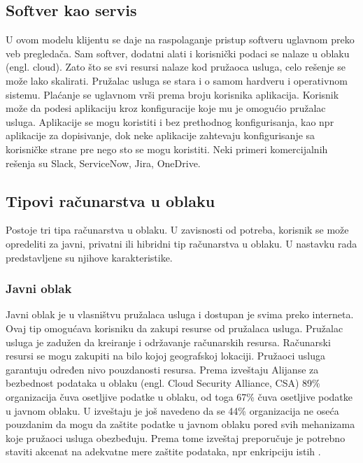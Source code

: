 \documentclass[12pt,oneside]{memoir}
\begin{document}
\subsection{Softver kao servis}
U ovom modelu klijentu se daje na raspolaganje pristup softveru uglavnom preko veb pregledača. Sam softver, dodatni alati i korisnički podaci se nalaze u oblaku (engl. cloud). Zato što se svi resursi nalaze kod pružaoca usluga, celo rešenje se može lako skalirati. Pružalac usluga se stara i o samom hardveru i operativnom sistemu. Plaćanje se uglavnom vrši prema broju korisnika aplikacija. Korisnik može da podesi aplikaciju kroz konfiguracije koje mu je omogućio pružalac usluga. Aplikacije se mogu koristiti i bez prethodnog konfigurisanja, kao npr aplikacije za dopisivanje, dok neke aplikacije zahtevaju konfigurisanje sa korisničke strane pre nego sto se mogu koristiti. Neki primeri komercijalnih rešenja su Slack, ServiceNow, Jira, OneDrive. %


\subsection{Tipovi računarstva u oblaku} %
 
Postoje tri tipa računarstva u oblaku. U zavisnosti od potreba, korisnik se može opredeliti za javni, privatni ili hibridni tip računarstva u oblaku. U nastavku rada predstavljene su njihove karakteristike.


\subsubsection{Javni oblak} %
Javni oblak je u vlasništvu pružalaca usluga i dostupan je svima preko interneta. Ovaj tip omogućava korisniku da zakupi resurse od pružalaca usluga. Pružalac usluga je zadužen da kreiranje i održavanje računarskih resursa. Računarski resursi se mogu zakupiti na bilo kojoj geografskoj lokaciji. Pružaoci usluga garantuju određen nivo pouzdanosti resursa. Prema izveštaju Alijanse za bezbednost podataka u oblaku (engl. Cloud Security Alliance, CSA) 89\% organizacija čuva osetljive podatke u oblaku, od toga 67\% čuva osetljive podatke u javnom oblaku. U izveštaju je još navedeno da se 44\% organizacija ne oseća pouzdanim da mogu da zaštite podatke u javnom oblaku pored svih mehanizama koje pružaoci usluga obezbeđuju. Prema tome izveštaj preporučuje je potrebno staviti akcenat na adekvatne mere zaštite podataka, npr enkripciju istih \cite{csa}.
\end{document}
